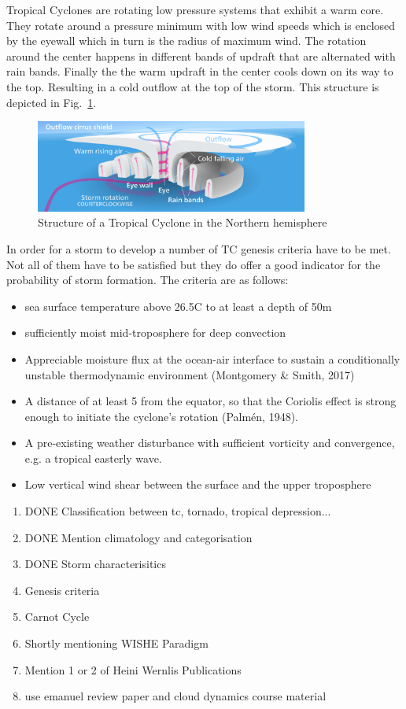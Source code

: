Tropical Cyclones are rotating low pressure systems that exhibit a warm core. They rotate around a pressure minimum with low wind speeds which is enclosed by the eyewall which in turn is the radius of maximum wind. The rotation around the center happens in different bands of updraft that are alternated with rain bands. Finally the the warm updraft in the center cools down on its way to the top. Resulting in a cold outflow at the top of the storm. This structure is depicted in Fig.~\ref{fig:tc-structure}.
\begin{figure}[ht]
	\centering
	\includegraphics[width=0.8\textwidth]{img/hurricane-structure.png}
	\caption{Structure of a Tropical Cyclone in the Northern hemisphere~\cite{hurricane-structure}}
	\label{fig:tc-structure}
\end{figure}
In order for a storm to develop a number of TC genesis criteria have to be met. Not all of them have to be satisfied but they do offer a good indicator for the probability of storm formation.
The criteria are as follows:
\begin{itemize}
	\item sea surface temperature above 26.5\degree C to at least a depth of 50m
	\item sufficiently moist mid-troposphere for deep convection
	\item Appreciable moisture flux at the ocean-air interface to sustain a conditionally unstable thermodynamic environment (Montgomery \& Smith, 2017)
	\item A distance of at least 5 from the equator, so that the Coriolis effect is strong enough to initiate the cyclone's rotation (Palm\'{e}n, 1948).
	\item A pre-existing weather disturbance with sufficient vorticity and convergence, e.g. a tropical easterly wave.
	\item Low vertical wind shear between the surface and the upper troposphere
\end{itemize}

\begin{enumerate}
	\item DONE Classification between tc, tornado, tropical depression...
	\item DONE Mention climatology and categorisation
	\item DONE Storm characterisitics
	\item Genesis criteria
	\item Carnot Cycle
	\item Shortly mentioning WISHE Paradigm
	\item Mention 1 or 2 of Heini Wernlis Publications
	\item use emanuel review paper and cloud dynamics course material
\end{enumerate}


